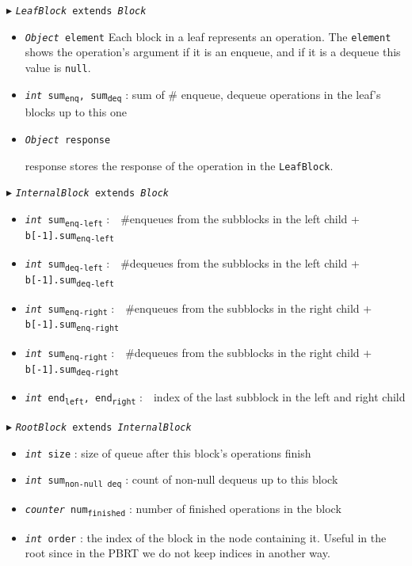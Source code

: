 \documentclass[10pt]{article}
\newcommand{\sub}[1]{\textsubscript{#1}}
\renewcommand{\tt}[1]{\texttt{#1}}
\renewcommand{\sl}[1]{\textsl{#1}}
\theoremstyle{definition}
\begin{document}
\begin{algorithm}
\begin{algorithmic}[1]
\begin{multicols}{2}
\Statex $\blacktriangleright$ \tt{\sl{LeafBlock} extends \sl{Block}}
\begin{itemize}
  \item \tt{\sl{Object} element}
  \textsf{Each block in a leaf represents an operation. The \tt{element} shows the operation's argument if it is an enqueue, and if it is a dequeue this value is \tt{null}.}
  
    \item \tt{\sl{int} sum\sub{enq}, sum\sub{deq}}
  \textsf{: sum of \# enqueue, dequeue operations in the leaf's blocks up to this one}

  
    \item \tt{\sl{Object} response}
  
  \textsf{response stores the response of the operation in the \tt{LeafBlock}.}
\end{itemize}

\Statex $\blacktriangleright$ \tt{\sl{InternalBlock} extends \sl{Block}}
\begin{itemize}
  \item \tt{\sl{int} sum\sub{enq-left}}
  \textsf{:~~\#enqueues from the subblocks in the left child + \tt{b[-1].sum\sub{enq-left}}}
  \item \tt{\sl{int} sum\sub{deq-left}}
  \textsf{:~~\#dequeues from the subblocks in the left child + \tt{b[-1].sum\sub{deq-left}}}
  \item \tt{\sl{int} sum\sub{enq-right}}
  \textsf{:~~\#enqueues from the subblocks in the right child + \tt{b[-1].sum\sub{enq-right}}}
  \item \tt{\sl{int} sum\sub{enq-right}}
  \textsf{:~~\#dequeues from the subblocks in the right child + \tt{b[-1].sum\sub{deq-right}}}
    \item \tt{\sl{int} end\sub{left}, end\sub{right}}
  \textsf{:~~index of the last subblock in the left and right child}
\end{itemize}


\Statex $\blacktriangleright$ \tt{\sl{RootBlock} extends \sl{InternalBlock}}
\begin{itemize}
  \item \tt{\sl{int} size}
  \textsf{: size of queue after this block's operations finish}
  \item \tt{\sl{int} sum\sub{non-null deq}}
  \textsf{: count of non-null dequeus up to this block}
  \item \tt{\sl{counter} num\sub{finished}}
  \textsf{: number of finished operations in the block}
    \item \tt{\sl{int} order}
  \textsf{: the index of the block in the node containing it. Useful in the root since in the PBRT we do not keep indices in another way.}
\end{itemize}


\end{multicols}
\end{algorithmic}
\end{algorithm}
\end{document}
